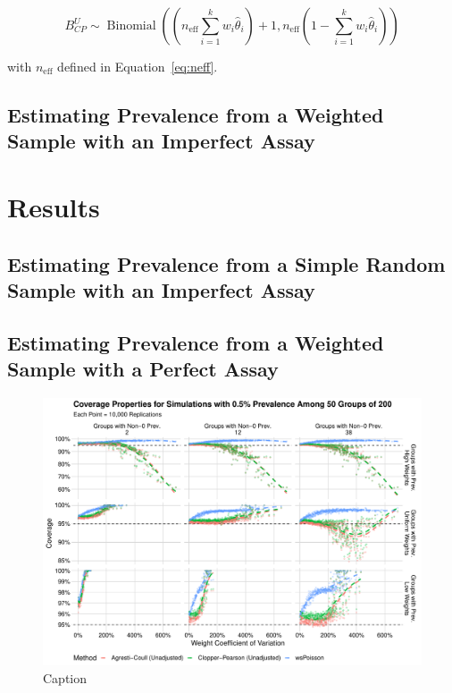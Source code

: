 \documentclass[AMA,STIX1COL]{WileyNJD-v2}
\begin{document}
\begin{equation}
    B^U_{CP} \sim \operatorname{Binomial}\left(\left(n_{\text{eff}} \sum_{i=1}^k w_i \hat{\theta}_i\right) + 1, n_{\text{eff}} \left(1 - \sum_{i=1}^k w_i \hat{\theta}_i \right)\right)
\end{equation}

with \( n_{\text{eff}} \) defined in Equation~\ref{eq:neff}.

\subsection{Estimating Prevalence from a Weighted Sample with an  Imperfect Assay}



\label{sec:weight-imperfect}

\section{Results}
\subsection{Estimating Prevalence from a Simple Random Sample with an Imperfect Assay}
\subsection{Estimating Prevalence from a Weighted Sample with a Perfect Assay}

\begin{figure}
    \centering
    \includegraphics[width=\textwidth]{figures/perfect_coverage_50_0_005_reduced.pdf}
    \caption{Caption}
    \label{fig:perfect_coverage_50_0_005_reduced}
\end{figure}
\end{document}
